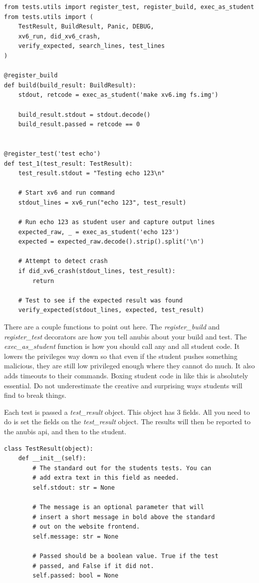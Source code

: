\begin{verbatim}
from tests.utils import register_test, register_build, exec_as_student
from tests.utils import (
    TestResult, BuildResult, Panic, DEBUG,
    xv6_run, did_xv6_crash,
    verify_expected, search_lines, test_lines
)

@register_build
def build(build_result: BuildResult):
    stdout, retcode = exec_as_student('make xv6.img fs.img')

    build_result.stdout = stdout.decode()
    build_result.passed = retcode == 0


@register_test('test echo')
def test_1(test_result: TestResult):
    test_result.stdout = "Testing echo 123\n"

    # Start xv6 and run command
    stdout_lines = xv6_run("echo 123", test_result)

    # Run echo 123 as student user and capture output lines
    expected_raw, _ = exec_as_student('echo 123')
    expected = expected_raw.decode().strip().split('\n')

    # Attempt to detect crash
    if did_xv6_crash(stdout_lines, test_result):
        return

    # Test to see if the expected result was found
    verify_expected(stdout_lines, expected, test_result)
\end{verbatim}

There are a couple functions to point out here.
The \textit{register\_build} and \textit{register\_test} decorators are how
you tell anubis about your build and test.
The \textit{exec\_as\_student} function is how you should call any and all student code.
It lowers the privileges way down so that even if the student pushes something
malicious, they are still low privileged enough where they cannot do much.
It also adds timeouts to their commands.
Boxing student code in like this is absolutely essential.
Do not underestimate the creative and surprising ways students will find to break things.

Each test is passed a \textit{test\_result} object.
This object has 3 fields.
All you need to do is set the fields on the \textit{test\_result} object.
The results will then be reported to the anubis api, and then to the student.

\begin{verbatim}
class TestResult(object):
    def __init__(self):
        # The standard out for the students tests. You can
        # add extra text in this field as needed.
        self.stdout: str = None

        # The message is an optional parameter that will
        # insert a short message in bold above the standard
        # out on the website frontend.
        self.message: str = None

        # Passed should be a boolean value. True if the test
        # passed, and False if it did not.
        self.passed: bool = None
\end{verbatim}

